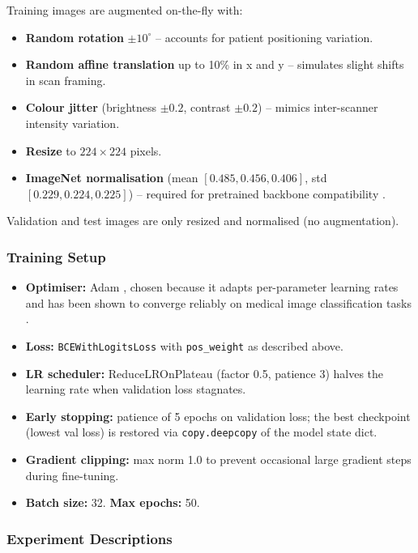 \documentclass[11pt,a4paper]{article}
\begin{document}
Training images are augmented on-the-fly with:
\begin{itemize}
    \item \textbf{Random rotation} $\pm10^\circ$ -- accounts for patient
          positioning variation.
    \item \textbf{Random affine translation} up to 10\% in x and y -- simulates
          slight shifts in scan framing.
    \item \textbf{Colour jitter} (brightness $\pm0.2$, contrast $\pm0.2$) --
          mimics inter-scanner intensity variation.
    \item \textbf{Resize} to $224 \times 224$ pixels.
    \item \textbf{ImageNet normalisation} (mean $[0.485, 0.456, 0.406]$, std
          $[0.229, 0.224, 0.225]$) -- required for pretrained backbone
          compatibility \cite{krizhevsky2012imagenet}.
\end{itemize}
Validation and test images are only resized and normalised (no augmentation).

\subsubsection{Training Setup}

\begin{itemize}
    \item \textbf{Optimiser:} Adam \cite{kingma2014adam}, chosen because it
          adapts per-parameter learning rates and has been shown to converge
          reliably on medical image classification tasks \cite{rajpurkar2017chexnet}.
    \item \textbf{Loss:} \texttt{BCEWithLogitsLoss} with \texttt{pos\_weight}
          as described above.
    \item \textbf{LR scheduler:} ReduceLROnPlateau (factor 0.5, patience 3)
          halves the learning rate when validation loss stagnates.
    \item \textbf{Early stopping:} patience of 5 epochs on validation loss;
          the best checkpoint (lowest val loss) is restored via
          \texttt{copy.deepcopy} of the model state dict.
    \item \textbf{Gradient clipping:} max norm 1.0 to prevent occasional
          large gradient steps during fine-tuning.
    \item \textbf{Batch size:} 32. \textbf{Max epochs:} 50.
\end{itemize}

\subsubsection{Experiment Descriptions}
\end{document}
